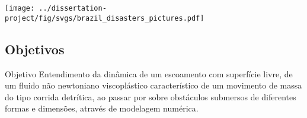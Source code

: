 \begin{frame}
    \begin{minipage}[c]{0.6\textwidth}
        \centering
        \texttt{[image: ../dissertation-project/fig/svgs/brazil\_disasters\_pictures.pdf]}
    \end{minipage}
    \hfill
    \begin{minipage}[c]{0.38\textwidth}
    \end{minipage}
\end{frame}

\subsection{Objetivos}

\begin{frame}
    \begin{exampleblock}{\Large Objetivo}
        \Large
        Entendimento da dinâmica de um escoamento com superfície livre, 
        de um fluido não newtoniano viscoplástico característico de um movimento de massa 
        do tipo corrida detrítica, ao passar por sobre obstáculos submersos de diferentes formas e dimensões, 
        através de modelagem numérica.
    \end{exampleblock}
\end{frame}

